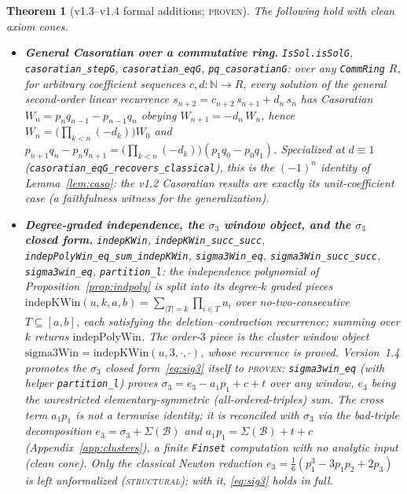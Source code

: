 \documentclass[11pt]{article}
\newtheorem{theorem}{Theorem}
\newcommand{\N}{\mathbb{N}}
\begin{document}
\begin{theorem}[v1.3--v1.4 formal additions; \textsc{proven}]\label{thm:lean-v13}
The following hold with clean axiom cones.
\begin{itemize}\sloppy
\item[\textnormal{(A)}] \textbf{General Casoratian over a commutative ring.}
\texttt{IsSol.isSolG}, \texttt{casoratian\_stepG}, \texttt{casoratian\_eqG},
\texttt{pq\_casoratianG}: over any \texttt{CommRing} $R$, for arbitrary coefficient
sequences $c,d:\N\to R$, every solution of the general second-order linear recurrence
$s_{n+2}=c_{n+2}\,s_{n+1}+d_n\,s_n$ has Casoratian $W_n=p_nq_{n-1}-p_{n-1}q_n$
obeying $W_{n+1}=-d_n\,W_n$, hence $W_n=\bigl(\prod_{k<n}(-d_k)\bigr)W_0$ and
$p_{n+1}q_n-p_nq_{n+1}=\bigl(\prod_{k<n}(-d_k)\bigr)(p_1q_0-p_0q_1)$.
Specialized at $d\equiv1$ (\texttt{casoratian\_eqG\_recovers\_classical}), this is the
$(-1)^n$ identity of Lemma~\ref{lem:caso}: the v1.2 Casoratian results are exactly its
unit-coefficient case (a faithfulness witness for the generalization).

\item[\textnormal{(B)}] \textbf{Degree-graded independence, the $\sigma_3$ window
object, and the $\sigma_3$ closed form.} \texttt{indepKWin}, \texttt{indepKWin\_succ\_succ},
\texttt{indepPolyWin\_eq\_sum\_indepKWin}, \texttt{sigma3Win\_eq},
\texttt{sigma3Win\_succ\_succ}, \texttt{sigma3win\_eq}, \texttt{partition\_l}: the
independence polynomial of
Proposition~\ref{prop:indpoly} is split into its degree-$k$ graded pieces
$\mathrm{indepKWin}(u,k,a,b)=\sum_{|T|=k}\prod_{i\in T}u_i$ over no-two-consecutive
$T\subseteq[a,b]$, each satisfying the deletion--contraction recurrence; summing over
$k$ returns $\mathrm{indepPolyWin}$. The order-$3$ piece is the cluster window object
$\mathrm{sigma3Win}=\mathrm{indepKWin}(u,3,\cdot,\cdot)$, whose recurrence is proved.
\emph{Version~1.4 promotes the $\sigma_3$ closed form~\eqref{eq:sig3} itself to
\textsc{proven}}: \texttt{sigma3win\_eq} (with helper \texttt{partition\_l}) proves
$\sigma_3=e_3-a_1p_1+c+t$ over any window, $e_3$ being the unrestricted
elementary-symmetric (all-ordered-triples) sum. The cross term $a_1p_1$ is \emph{not}
a termwise identity; it is reconciled with $\sigma_3$ via the bad-triple decomposition
$e_3=\sigma_3+\Sigma(\mathcal B)$ and $a_1p_1=\Sigma(\mathcal B)+t+c$
(Appendix~\ref{app:clusters}), a finite \texttt{Finset} computation with no analytic
input (clean cone). Only the classical Newton reduction
$e_3=\tfrac16(p_1^3-3p_1p_2+2p_3)$ is left unformalized (\textsc{structural}); with it,
\eqref{eq:sig3} holds in full.


\end{itemize}
\end{theorem}
\end{document}

